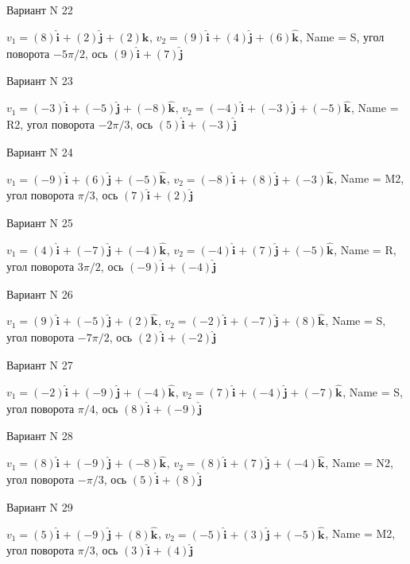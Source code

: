 \documentclass[11pt]{report}
\begin{document}
Вариант N 22

$v_1 = (8)\mathbf{\hat{i}_{}} + (2)\mathbf{\hat{j}_{}} + (2)\mathbf{\hat{k}_{}}$, $v_2 = (9)\mathbf{\hat{i}_{}} + (4)\mathbf{\hat{j}_{}} + (6)\mathbf{\hat{k}_{}}$, Name = S, угол поворота $- 5 \pi / 2$, ось $(9)\mathbf{\hat{i}_{}} + (7)\mathbf{\hat{j}_{}}$

Вариант N 23

$v_1 = (-3)\mathbf{\hat{i}_{}} + (-5)\mathbf{\hat{j}_{}} + (-8)\mathbf{\hat{k}_{}}$, $v_2 = (-4)\mathbf{\hat{i}_{}} + (-3)\mathbf{\hat{j}_{}} + (-5)\mathbf{\hat{k}_{}}$, Name = R2, угол поворота $- 2 \pi / 3$, ось $(5)\mathbf{\hat{i}_{}} + (-3)\mathbf{\hat{j}_{}}$

Вариант N 24

$v_1 = (-9)\mathbf{\hat{i}_{}} + (6)\mathbf{\hat{j}_{}} + (-5)\mathbf{\hat{k}_{}}$, $v_2 = (-8)\mathbf{\hat{i}_{}} + (8)\mathbf{\hat{j}_{}} + (-3)\mathbf{\hat{k}_{}}$, Name = M2, угол поворота $\pi / 3$, ось $(7)\mathbf{\hat{i}_{}} + (2)\mathbf{\hat{j}_{}}$

Вариант N 25

$v_1 = (4)\mathbf{\hat{i}_{}} + (-7)\mathbf{\hat{j}_{}} + (-4)\mathbf{\hat{k}_{}}$, $v_2 = (-4)\mathbf{\hat{i}_{}} + (7)\mathbf{\hat{j}_{}} + (-5)\mathbf{\hat{k}_{}}$, Name = R, угол поворота $3 \pi / 2$, ось $(-9)\mathbf{\hat{i}_{}} + (-4)\mathbf{\hat{j}_{}}$

Вариант N 26

$v_1 = (9)\mathbf{\hat{i}_{}} + (-5)\mathbf{\hat{j}_{}} + (2)\mathbf{\hat{k}_{}}$, $v_2 = (-2)\mathbf{\hat{i}_{}} + (-7)\mathbf{\hat{j}_{}} + (8)\mathbf{\hat{k}_{}}$, Name = S, угол поворота $- 7 \pi / 2$, ось $(2)\mathbf{\hat{i}_{}} + (-2)\mathbf{\hat{j}_{}}$

Вариант N 27

$v_1 = (-2)\mathbf{\hat{i}_{}} + (-9)\mathbf{\hat{j}_{}} + (-4)\mathbf{\hat{k}_{}}$, $v_2 = (7)\mathbf{\hat{i}_{}} + (-4)\mathbf{\hat{j}_{}} + (-7)\mathbf{\hat{k}_{}}$, Name = S, угол поворота $\pi / 4$, ось $(8)\mathbf{\hat{i}_{}} + (-9)\mathbf{\hat{j}_{}}$

Вариант N 28

$v_1 = (8)\mathbf{\hat{i}_{}} + (-9)\mathbf{\hat{j}_{}} + (-8)\mathbf{\hat{k}_{}}$, $v_2 = (8)\mathbf{\hat{i}_{}} + (7)\mathbf{\hat{j}_{}} + (-4)\mathbf{\hat{k}_{}}$, Name = N2, угол поворота $- \pi / 3$, ось $(5)\mathbf{\hat{i}_{}} + (8)\mathbf{\hat{j}_{}}$

Вариант N 29

$v_1 = (5)\mathbf{\hat{i}_{}} + (-9)\mathbf{\hat{j}_{}} + (8)\mathbf{\hat{k}_{}}$, $v_2 = (-5)\mathbf{\hat{i}_{}} + (3)\mathbf{\hat{j}_{}} + (-5)\mathbf{\hat{k}_{}}$, Name = M2, угол поворота $\pi / 3$, ось $(3)\mathbf{\hat{i}_{}} + (4)\mathbf{\hat{j}_{}}$
\end{document}
